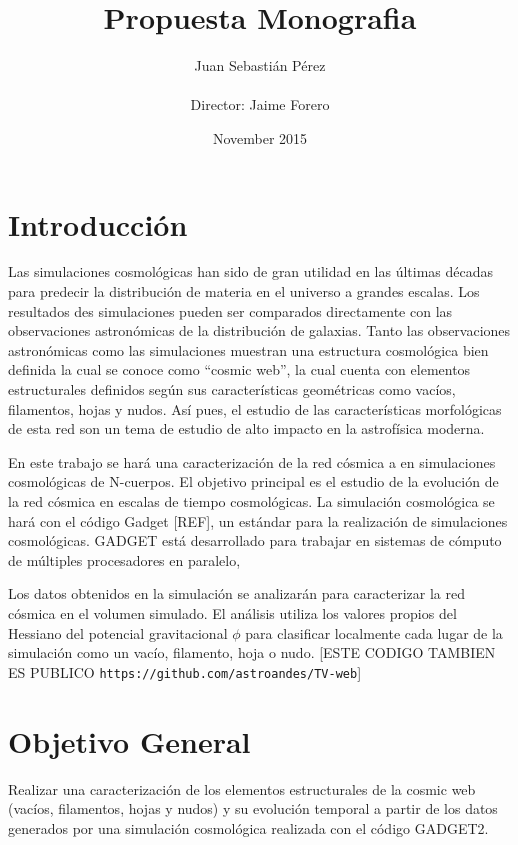 \documentclass{article}
\title{Propuesta Monografia}
\author{Juan Sebastián Pérez\\ \\Director: Jaime Forero}
\date{November 2015}
\begin{document}
\maketitle

\section{Introducción}

Las simulaciones cosmológicas han sido de gran utilidad en 
las últimas décadas para predecir la distribuci\'on de materia 
en el universo a grandes escalas.
Los resultados des simulaciones pueden ser comparados
directamente con las observaciones astron\'omicas de la distribuci\'on
de galaxias. 
Tanto las observaciones astronómicas como las simulaciones muestran
una estructura cosmológica bien definida la cual se conoce como
“cosmic web”, la cual cuenta con elementos 
estructurales definidos según sus características geométricas como
vacíos, filamentos, hojas y nudos.  
Así pues, el estudio de las  características morfológicas de esta red
son un tema de estudio de alto impacto en la astrofísica moderna. 

En este trabajo se har\'a una caracterización de la red c\'osmica a
en simulaciones cosmológicas de N-cuerpos. 
El objetivo principal es el estudio de la evoluci\'on de la red
c\'osmica en escalas de tiempo cosmol\'ogicas.
La simulación cosmol\'ogica se hará con el c\'odigo Gadget [REF], 
un estándar para la realización de simulaciones cosmológicas. GADGET
est\'a desarrollado para trabajar en sistemas de cómputo de múltiples
procesadores en paralelo, 


Los datos obtenidos en la simulación se analizar\'an para caracterizar
la red c\'osmica en el volumen simulado. 
El an\'alisis  utiliza los valores propios del Hessiano del potencial
gravitacional $\phi$ para clasificar localmente cada lugar de la
simulaci\'on como un vac\'io, filamento, hoja o nudo.
[ESTE CODIGO TAMBIEN ES PUBLICO \verb"https://github.com/astroandes/TV-web"]


\section{Objetivo General}

Realizar una caracterización de los elementos estructurales de la
cosmic web (vacíos, filamentos, hojas y nudos) y su evolución temporal
a partir de los datos generados por una simulación cosmológica
realizada con el código GADGET2. 
\end{document}
